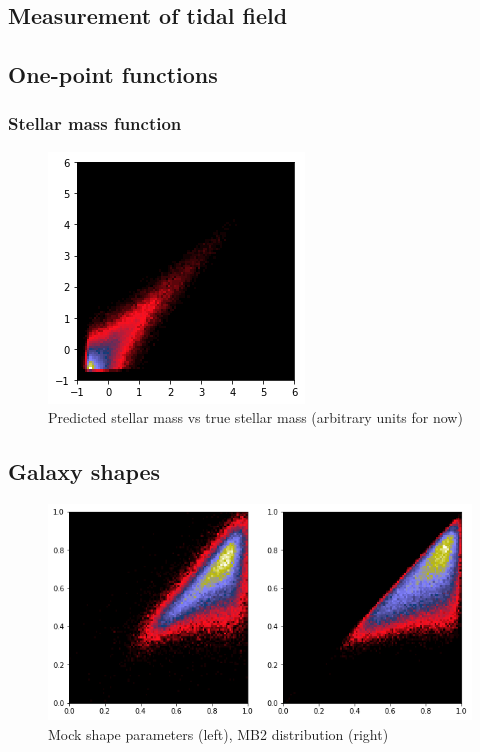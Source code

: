 \documentclass[a4paper,fleqn,usenatbib]{mnras}
\begin{document}
	\subsection{Measurement of tidal field}


\subsection{One-point functions}

	\subsubsection{Stellar mass function}

\begin{figure}
    \centering
    \includegraphics[width=0.5\columnwidth]{Figures/mStar_pred}
    \caption{Predicted stellar mass vs true stellar mass (arbitrary units for now)}
    \label{fig:my_label}
\end{figure}

	\subsection{Galaxy shapes}

\begin{figure}
    \centering
    \includegraphics[width=\columnwidth]{Figures/qs_plot}
    \caption{Mock shape parameters (left), MB2 distribution (right)}
    \label{fig:my_label}
\end{figure}
\end{document}
